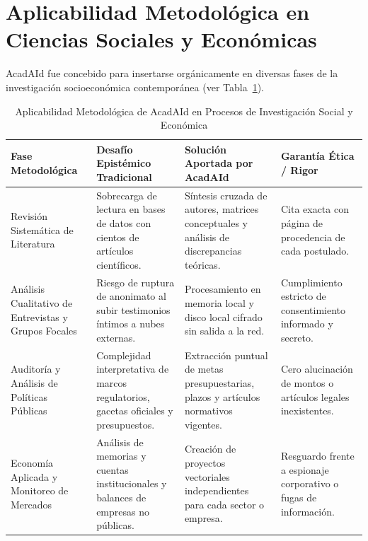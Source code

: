 \documentclass[12pt,a4paper]{article}
\begin{document}
\section{Aplicabilidad Metodológica en Ciencias Sociales y Económicas}
\label{sec:aplicabilidad}

AcadAId fue concebido para insertarse orgánicamente en diversas fases de la investigación socioeconómica contemporánea (ver Tabla~\ref{tab:casos_uso}).

\begin{table}[htbp]
\centering
\caption{Aplicabilidad Metodológica de AcadAId en Procesos de Investigación Social y Económica}
\label{tab:casos_uso}
\small
\begin{tabularx}{\textwidth}{>{\raggedright\arraybackslash}p{3.2cm} >{\raggedright\arraybackslash}X >{\raggedright\arraybackslash}X >{\raggedright\arraybackslash}p{3.5cm}}
\toprule
\textbf{Fase Metodológica} & \textbf{Desafío Epistémico Tradicional} & \textbf{Solución Aportada por AcadAId} & \textbf{Garantía Ética / Rigor} \\
\midrule
Revisión Sistemática de Literatura & Sobrecarga de lectura en bases de datos con cientos de artículos científicos. & Síntesis cruzada de autores, matrices conceptuales y análisis de discrepancias teóricas. & Cita exacta con página de procedencia de cada postulado. \\
\addlinespace
Análisis Cualitativo de Entrevistas y Grupos Focales & Riesgo de ruptura de anonimato al subir testimonios íntimos a nubes externas. & Procesamiento en memoria local y disco local cifrado sin salida a la red. & Cumplimiento estricto de consentimiento informado y secreto. \\
\addlinespace
Auditoría y Análisis de Políticas Públicas & Complejidad interpretativa de marcos regulatorios, gacetas oficiales y presupuestos. & Extracción puntual de metas presupuestarias, plazos y artículos normativos vigentes. & Cero alucinación de montos o artículos legales inexistentes. \\
\addlinespace
Economía Aplicada y Monitoreo de Mercados & Análisis de memorias y cuentas institucionales y balances de empresas no públicas. & Creación de proyectos vectoriales independientes para cada sector o empresa. & Resguardo frente a espionaje corporativo o fugas de información. \\
\bottomrule
\end{tabularx}
\end{table}
\end{document}
